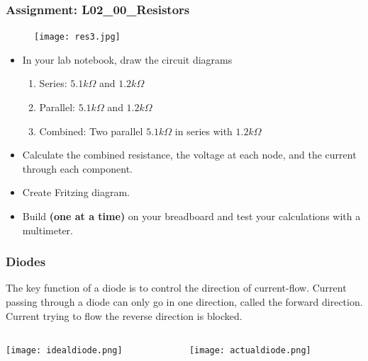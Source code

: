 \documentclass{beamer}
\begin{document}
\begin{frame}
\frametitle{Assignment: L02\_00\_Resistors}
\begin{figure}
\texttt{[image: res3.jpg]} 
\end{figure}
\begin{itemize}
\item In your lab notebook, draw the circuit diagrams
	\begin{enumerate}
	\item Series:   $5.1k\Omega$ and $1.2k\Omega$
	\item Parallel: $5.1k\Omega$ and $1.2k\Omega$
	\item Combined: Two parallel $5.1k\Omega$ in series with $1.2k\Omega$
	\end{enumerate}
\item Calculate the combined resistance, the voltage at each node, and the current through each component.
\item Create Fritzing diagram.
\item Build \textbf{(one at a time)} on your breadboard and test your calculations with a multimeter.
\end{itemize}
\end{frame}

\begin{frame}\frametitle{Diodes}
The key function of a diode is to control the direction of current-flow. Current passing through a diode can only go in one direction, called the forward direction. Current trying to flow the reverse direction is blocked. \newline 
\begin{columns}
\begin{column}{5cm}
\texttt{[image: idealdiode.png]}
\end{column}
\begin{column}{5cm}
\texttt{[image: actualdiode.png]}
\end{column}
\end{columns}
\end{frame}
\end{document}
